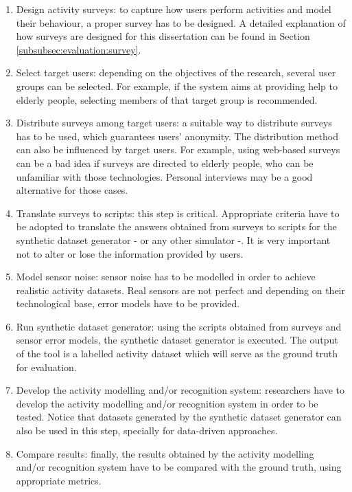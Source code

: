 \begin{enumerate}
 \item Design activity surveys: to capture how users perform activities and model their behaviour, a proper survey has to be designed. A detailed explanation of how surveys are designed for this dissertation can be found in Section \ref{subsubsec:evaluation:survey}.
 \item Select target users: depending on the objectives of the research, several user groups can be selected. For example, if the system aims at providing help to elderly people, selecting members of that target group is recommended.
 \item Distribute surveys among target users: a suitable way to distribute surveys has to be used, which guarantees users' anonymity. The distribution method can also be influenced by target users. For example, using web-based surveys can be a bad idea if surveys are directed to elderly people, who can be unfamiliar with those technologies. Personal interviews may be a good alternative for those cases.
 \item Translate surveys to scripts: this step is critical. Appropriate criteria have to be adopted to translate the answers obtained from surveys to scripts for the synthetic dataset generator - or any other simulator -. It is very important not to alter or lose the information provided by users.
 \item Model sensor noise: sensor noise has to be modelled in order to achieve realistic activity datasets. Real sensors are not perfect and depending on their technological base, error models have to be provided.
 \item Run synthetic dataset generator: using the scripts obtained from surveys and sensor error models, the synthetic dataset generator is executed. The output of the tool is a labelled activity dataset which will serve as the ground truth for evaluation.
 \item Develop the activity modelling and/or recognition system: researchers have to develop the activity modelling and/or recognition system in order to be tested. Notice that datasets generated by the synthetic dataset generator can also be used in this step, specially for data-driven approaches.
 \item Compare results: finally, the results obtained by the activity modelling and/or recognition system have to be compared with the ground truth, using appropriate metrics.
\end{enumerate}


